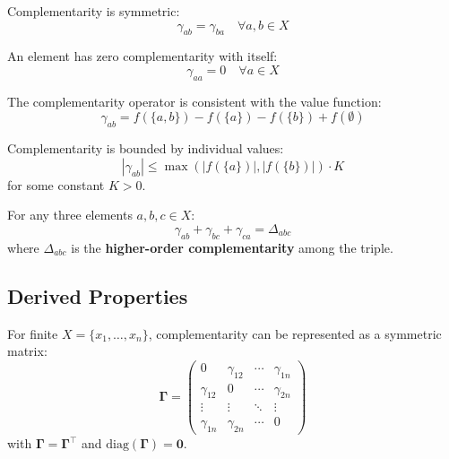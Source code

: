 \begin{axiom}[Symmetry]
\label{ax:symmetry}
Complementarity is symmetric:
\begin{equation}
\gamma_{ab} = \gamma_{ba} \quad \forall a, b \in X
\end{equation}
\end{axiom}

\begin{axiom}
\label{ax:self}
An element has zero complementarity with itself:
\begin{equation}
\gamma_{aa} = 0 \quad \forall a \in X
\end{equation}
\end{axiom}

\begin{axiom}[Consistency]
\label{ax:consistency}
The complementarity operator is consistent with the value function:
\begin{equation}
\gamma_{ab} = f(\{a, b\}) - f(\{a\}) - f(\{b\}) + f(\emptyset)
\end{equation}
\end{axiom}

\begin{axiom}[Boundedness]
\label{ax:bounded}
Complementarity is bounded by individual values:
\begin{equation}
|\gamma_{ab}| \leq \max(|f(\{a\})|, |f(\{b\})|) \cdot K
\end{equation}
for some constant $K > 0$.
\end{axiom}

\begin{axiom}
\label{ax:transitivity}
For any three elements $a, b, c \in X$:
\begin{equation}
\gamma_{ab} + \gamma_{bc} + \gamma_{ca} = \Delta_{abc}
\end{equation}
where $\Delta_{abc}$ is the \textbf{higher-order complementarity} among the triple.
\end{axiom}

\subsection{Derived Properties}

\begin{theorem}
\label{thm:matrix}
For finite $X = \{x_1, \ldots, x_n\}$, complementarity can be represented as a symmetric matrix:
\begin{equation}
\boldsymbol{\Gamma} = \begin{pmatrix}
0 & \gamma_{12} & \cdots & \gamma_{1n} \\
\gamma_{12} & 0 & \cdots & \gamma_{2n} \\
\vdots & \vdots & \ddots & \vdots \\
\gamma_{1n} & \gamma_{2n} & \cdots & 0
\end{pmatrix}
\end{equation}
with $\boldsymbol{\Gamma} = \boldsymbol{\Gamma}^\top$ and $\text{diag}(\boldsymbol{\Gamma}) = \mathbf{0}$.
\end{theorem}

